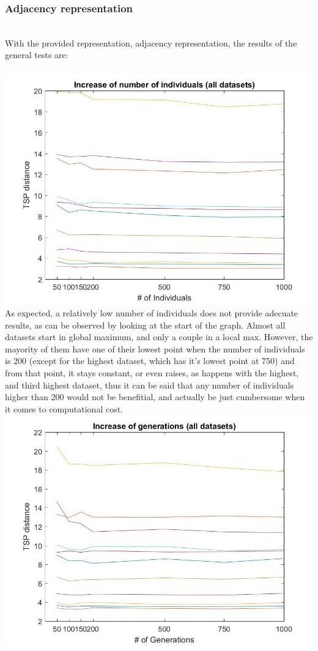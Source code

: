 \subsubsection{Adjacency representation}
\\
With the provided representation, adjacency representation, the results of the
general tests are:\\
\\
\includegraphics[width=\textwidth]{img/xalt_edges/numberIndiv.jpg}\\
As expected, a relatively low number of individuals does not provide adecuate
results, as can be observed by looking at the start of the graph. Almost
all datasets start in global maximum, and only a couple in a local max. However,
the mayority of them have one of their lowest point when the number of
individuals is 200 (except for the highest dataset, which has it's lowest
point at 750) and from that point, it stays constant, or even raises, as
happens with the highest, and third highest dataset, thus it can be said
that any number of individuals higher than 200 would not be benefitial, and
actually be just cumbersome when it comes to computational cost. 
\\
\includegraphics[width=\textwidth]{img/xalt_edges/numberGens.jpg}\\
